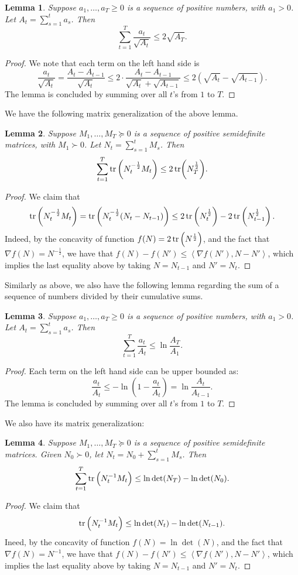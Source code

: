 \documentclass{article}
\newtheorem{lemma}{Lemma}
\newcommand{\inner}[2]{\left\langle #1,#2 \right\rangle}
\begin{document}
\begin{lemma}
Suppose $a_1, \ldots, a_T \geq 0$ is a sequence of positive numbers, with $a_1 > 0$. Let $A_t = \sum_{s=1}^t a_s$. Then
\[ \sum_{t=1}^T \frac{a_t}{\sqrt{A_t}} \leq 2\sqrt{A_T}. \]
\label{lem:sca-sqrt}
\end{lemma}
\begin{proof}
We note that each term on the left hand side is
\[ \frac{a_t}{\sqrt{A_t}} = \frac{A_t - A_{t-1}}{\sqrt{A_t}} \leq 2 \cdot \frac{A_t - A_{t-1}}{\sqrt{A_t} + \sqrt{A_{t-1}}} \leq 2(\sqrt{A_t} - \sqrt{A_{t-1}}). \]
The lemma is concluded by summing over all $t$'s from $1$ to $T$.
\end{proof}

We have the following matrix generalization of the above lemma.
\begin{lemma}
  Suppose $M_1, \ldots, M_T \succeq 0$ is a sequence of positive semidefinite matrices, with $M_1 \succ 0$. Let $N_t = \sum_{s=1}^t M_s$. Then
  \[ \sum_{t=1}^T \tr\del{N_t^{-\frac12} M_t} \leq 2\tr(N_T^{\frac12}). \]
  \label{lem:mat-sqrt}
\end{lemma}
\begin{proof}
We claim that
\[ \tr\del{N_t^{-\frac12} M_t} = \tr\del{N_t^{-\frac12} (N_t - N_{t-1})} \leq 2\tr\del{N_t^{\frac12}} - 2\tr\del{N_{t-1}^\frac12}. \]
Indeed, by the concavity of function $f(N) = 2\tr\del{N^{\frac12}}$, and the fact that
$\nabla f(N) = N^{-\frac12}$, we have that $f(N) - f(N') \leq \inner{\nabla f(N')}{N - N'}$, which implies the last equality above by taking $N = N_{t-1}$ and $N' = N_t$.
\end{proof}

Similarly as above, we also have the following lemma regarding the sum of a sequence of
numbers divided by their cumulative sums.

\begin{lemma}
Suppose $a_1, \ldots, a_T \geq 0$ is a sequence of positive numbers, with $a_1 > 0$. Let $A_t = \sum_{s=1}^t a_s$. Then
\[ \sum_{t=1}^T \frac{a_t}{A_t} \leq \ln \frac{A_T}{A_1}. \]
\label{lem:sca-ln}
\end{lemma}
\begin{proof}
Each term on the left hand side can be upper bounded as:
\[ \frac{a_t}{A_t} \leq -\ln(1-\frac{a_t}{A_t}) = \ln\frac{A_t}{A_{t-1}}. \]
The lemma is concluded by summing over all $t$'s from $1$ to $T$.
\end{proof}

We also have its matrix generalization:
\begin{lemma}
  Suppose $M_1, \ldots, M_T \succeq 0$ is a sequence of positive semidefinite matrices. Given $N_0 \succ 0$, let $N_t = N_0 + \sum_{s=1}^t M_s$. Then
  \[ \sum_{t=1}^T \tr\del{N_t^{-1} M_t} \leq \ln\det(N_T) - \ln\det(N_0). \]
  \label{lem:mat-ln}
\end{lemma}
\begin{proof}
We claim that
\[ \tr\del{N_t^{-1} M_t} \leq \ln\det(N_{t}) - \ln\det(N_{t-1}). \]
Ineed, by the concavity of function $f(N) = \ln\det(N)$, and the fact that $\nabla f(N) = N^{-1}$, we have that $f(N) - f(N') \leq \inner{\nabla f(N')}{N - N'}$, which implies the last equality above by taking $N = N_{t-1}$ and $N' = N_t$.
\end{proof}


\end{document}
